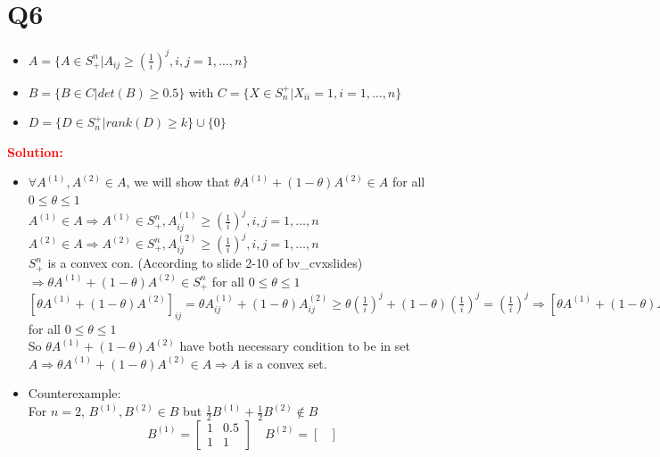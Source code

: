 \documentclass[a4paper]{article}
\begin{document}
\section{Q6}
\begin{latin}
\begin{itemize}
	\item $ A = \{A \in  S_{+}^{n} |  A_{ij} \geq (\frac{1}{i})^{j}, i, j = 1, \dots , n\} $
	\item $B = \{B \in C | det(B) \geq 0.5 \}$ with $ C = \{X \in S_{n}^{+} | X_{ii} = 1, i = 1, \dots , n\}$ 
	\item $ D = \{D \in S_{n}^{+} | rank(D) \geq k\} \cup \{0\} $
\end{itemize}
\textcolor{red}{\textbf{Solution:}}
\begin{itemize}
	\item $ \forall A^{(1)}, A^{(2)} \in A $, we will show that $ \theta A^{(1)} + (1-\theta) A^{(2)} \in A $ for all $ 0 \leq \theta \leq 1 $
	\\
	$ A^{(1)} \in A \Rightarrow A^{(1)} \in  S_{+}^{n}, A^{(1)}_{ij} \geq (\frac{1}{i})^{j}, i, j = 1, \dots , n $
	\\
	$ A^{(2)} \in A \Rightarrow A^{(2)} \in  S_{+}^{n}, A^{(2)}_{ij} \geq (\frac{1}{i})^{j}, i, j = 1, \dots , n $
	\\
	$ S_{+}^{n}  $ is a convex con. (According to slide 2-10 of bv\_cvxslides) $ \Rightarrow \theta A^{(1)} + (1-\theta) A^{(2)} \in S_{+}^{n} $ for all $ 0 \leq \theta \leq 1 $
	\\
	$ [\theta A^{(1)} + (1-\theta) A^{(2)}]_{ij} = \theta A^{(1)}_{ij} + (1-\theta) A^{(2)}_{ij} \geq \theta (\frac{1}{i})^{j} + (1-\theta) (\frac{1}{i})^{j} = (\frac{1}{i})^{j} \Rightarrow [\theta A^{(1)} + (1-\theta) A^{(2)}]_{ij} \geq (\frac{1}{i})^{j} $ for all $ 0 \leq \theta \leq 1 $
	\\
	So $ \theta A^{(1)} + (1-\theta) A^{(2)} $ have both necessary condition to be in set $ A \Rightarrow \theta A^{(1)} + (1-\theta) A^{(2)} \in A \Rightarrow A $ is a convex set.
	\item Counterexample: 
	\\
	For $ n = 2 $, $ B^{(1)}, B^{(2)} \in B $ but $ \frac{1}{2} B^{(1)} + \frac{1}{2} B^{(2)} \notin  B $
	\begin{equation*}
		B^{(1)} = \begin{bmatrix}
			1 & 0.5 \\
			1 & 1
		\end{bmatrix}
		\quad
		B^{(2)} = \begin{bmatrix}

\end{bmatrix}
\end{equation*}
\end{itemize}
\end{latin}
\end{document}
